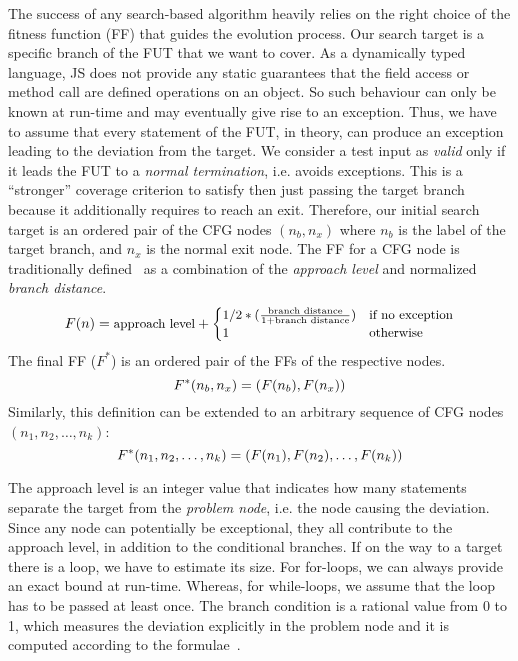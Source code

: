 The success of any search-based algorithm heavily relies on the right choice of the fitness function (FF) that guides the evolution process. Our search target is a specific branch of the FUT that we want to cover. As a dynamically typed language, JS does not provide any static guarantees that the field access or method call are defined operations on an object. So such behaviour can only be known at run-time and may eventually give rise to an exception. Thus, we have to assume that every statement of the FUT, in theory, can produce an exception leading to the deviation from the target. We consider a test input as \emph{valid} only if it leads the FUT to a \emph{normal termination}, i.e. avoids exceptions. This is a ``stronger'' coverage criterion to satisfy then just passing the target branch because it additionally requires to reach an exit. Therefore, our initial search target is an ordered pair of the CFG nodes $(n_b, n_x)$ where $n_b$ is the label of the target branch, and $n_x$ is the normal exit node. The FF for a CFG node is traditionally defined~\cite{arcuri2010does} as a combination of the \emph{approach level} and normalized \emph{branch distance}.
\begin{equation}
\footnotesize
F(n) = \text{approach level} +
\begin{cases}
 1/2 * (\frac{\text{branch distance}}{1 + \text{branch distance}}) & \text{if no exception}\\
 1                                  & \text{otherwise}
\end{cases}
\end{equation}
The final FF ($F^*$) is an ordered pair of the FFs of the respective nodes.
\begin{equation}
\footnotesize
F^*(n_b, n_x) = (F(n_b), F(n_x))
\end{equation}
Similarly, this definition can be extended to an arbitrary sequence of CFG nodes $(n_1, n_2, \ldots, n_k)$:
 \begin{equation}
\footnotesize
F^*(n_1, n_2, \ldots, n_k) = (F(n_1), F(n_2), \ldots, F(n_k))
\end{equation}

The approach level is an integer value that indicates how many statements separate the target from the \emph{problem node}, i.e. the node causing the deviation. Since any node can potentially be exceptional, they all contribute to the approach level, in addition to the conditional branches. If on the way to a target there is a loop, we have to estimate its size. For for-loops, we can always provide an exact bound at run-time. Whereas, for while-loops, we assume that the loop has to be passed at least once. The branch condition is a rational value from 0 to 1, which measures the deviation explicitly in the problem node and it is computed according to the formulae~\cite{tracey1998automated}.
